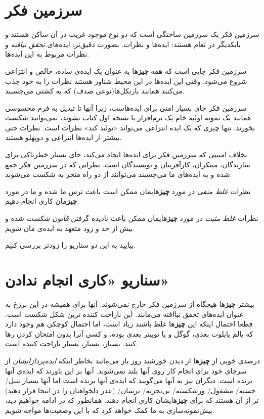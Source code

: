 \section{سرزمین
فکر}\label{ux633ux631ux632ux645ux6ccux646-ux641ux6a9ux631}

سرزمین فکر یک سرزمین ساختگی است که دو نوع موجود غریب در آن ساکن هستند و
بایکدیگر در تعام هستند: ایده‌ها و نظرات. بصورت دقیق‌تر: ایده‌های
\emph{تحقق نیافته} و نظرات مربوط به این ایده‌ها.

سرزمین فکر جایی است که همه \textbf{چیز}ها به عنوان یک ایده‌ی ساده، خالص
و انتزاعی شروع می‌شود. وقتی این ایده‌ها در این محیط شناور هستند نظرات را
به خود جذب می‌کنند همانند بارنکل‌ها(نوعی صدف) که به کشتی می‌چسبند.

سرزمین فکر جای بسیار امنی برای ایده‌هاست، زیرا آنها تا تبدیل به فرم
محسوسی همانند یک نمونه اولیه خام یک نرم‌افزار یا نسخه اول کتاب نشوند،
نمی‌توانند شکست بخورند. تنها چیزی که یک ایده انتزاعی می‌تواند «تولید
کند» نظرات است. نظرات حتی بیشتر از ایده‌ها انتزاعی و دوپهلو هستند.

بخلاف امنیتی که سرزمین فکر برای ایده‌ها ایجاد می‌کند، جای بسیار خطرناکی
برای سازندگان، مبتکران، کارآفرینان و نویسندگان است. نظراتی که در سرزمین
فکر جمع شده و به ایده‌های ما می‌چسبند می‌توانند از دو راه منجر به شکست
می‌شوند:

نظرات \emph{غلط منفی} در مورد \textbf{چیز}هایمان ممکن است باعث ترس ما
شده و ما در مورد \textbf{چیز}مان کاری انجام دهیم.

نظرات \emph{غلط مثبت} در مورد \textbf{چیز}هایمان ممکن باعث نادیده گرفتن
\emph{قانون شکست} شده و بیش از حد و زود متعهد به ایده‌ی مان شویم.

بیایید به این دو سناریو را زودتر بررسی کنیم.

\section{سناریو «کاری انجام
ندادن»}\label{ux633ux646ux627ux631ux6ccux648-ux6a9ux627ux631ux6cc-ux627ux646ux62cux627ux645-ux646ux62fux627ux62fux646}

بیشتر \textbf{چیز}ها هیچگاه از سرزمین فکر خارج نمی‌شوند. آنها برای همیشه
در این برزخ به عنوان ایده‌های تحقق نیاافته می‌مانند. این ناراحت کننده
ترین شکل شکست است. قطعا احتمال اینکه این \textbf{چیز}ها غلط باشند زیاد
است، اما احتمال کوچکی هم وجود دارد که پالم پایلوت بعدی، گوگل و یا توییتر
بعدی بوده، و کسی آنرا بدون امتحان کردن رها کنند. بسیار، بسیار، بسیار
ناراحت کننده است.

درصدی خوبی از \textbf{چیز}ها از دیدن خورشید روز باز می‌مانند بخاطر اینکه
\emph{ایده‌پردازانشان} از سرجای خود برای انجام کار روی آنها بلند
نمی‌شوند. آنها بر این باورند که ایده‌ی آنها برنده است. دیگران نیز به
آنها می‌گویند که ایده‌ی آنها برنده است اما آنها بسیار تنبل/ خسته/ مشغول/
ورشکسته/ بی‌تجربه/ ترسان/ (عذر دلخواهتان را در اینجا قرار دهید) تر از آن
هستند که برای \textbf{چیز}هایشان کاری انجام دهند. همانطور که در ادامه
خواهیم دید، پیش‌نمونه‌سازی به ما کمک خواهد کرد که با این وضعیت‌ها مواجه
شویم.

